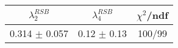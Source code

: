 \begin{tabular}{c|c||c}
$\lambda_{2}^{RSB}$ & $\lambda_4^{RSB}$ & $\chi^{2}$/ndf \\
\hline
0.314 $\pm$ 0.057 & 0.12 $\pm$ 0.13 & 100/99\\
\end{tabular}
